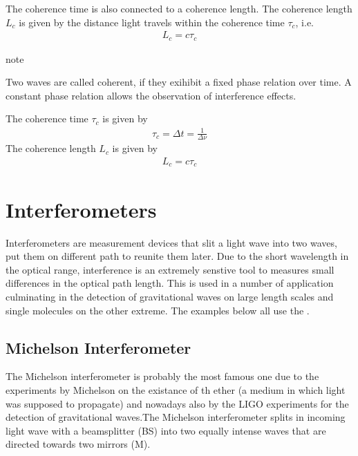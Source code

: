 \documentclass[letterpaper,10pt,english]{sphinxmanual}
\begin{document}
The coherence time is also connected to a coherence length. The coherence length \(L_c\) is given by the distance light travels within the coherence time \(\tau_c\), i.e.
\begin{equation*}
\begin{split}L_c=c\tau_c\end{split}
\end{equation*}
\begin{sphinxadmonition}{note}{}\unskip
{}

Two waves are called coherent, if they exihibit a fixed phase relation over time. A constant phase relation allows the observation of interference effects.

The coherence time \(\tau_c\) is given by
\begin{equation*}
\begin{split}\tau_{c}=\Delta t =\frac{1}{\Delta \nu}\end{split}
\end{equation*}
The coherence length \(L_c\) is given by
\begin{equation*}
\begin{split}L_c=c\tau_c\end{split}
\end{equation*}\end{sphinxadmonition}


\section{Interferometers}
\label{\detokenize{notebooks/L9/Interference:Interferometers}}
Interferometers are measurement devices that slit a light wave into two waves, put them on different path to reunite them later. Due to the short wavelength in the optical range, interference is an extremely senstive tool to measures small differences in the optical path length. This is used in a number of application culminating in the detection of gravitational waves on large length scales and single molecules on the other extreme. The examples below all use the .


\subsection{Michelson Interferometer}
\label{\detokenize{notebooks/L9/Interference:Michelson-Interferometer}}
The Michelson interferometer is probably the most famous one due to the experiments by Michelson on the existance of th ether (a medium in which light was supposed to propagate) and nowadays also by the LIGO experiments for the detection of gravitational waves.The Michelson interferometer splits in incoming light wave with a beamsplitter (BS) into two equally intense waves that are directed towards two mirrors (M).
\end{document}
